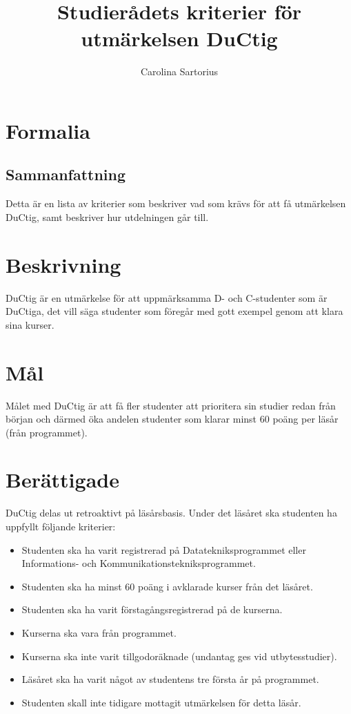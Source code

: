\documentclass{dsekprotokoll}
\title{Studierådets kriterier för utmärkelsen DuCtig}
\author{Carolina Sartorius}
\begin{document}
\maketitle

\section{Formalia}
\subsection{Sammanfattning}
Detta är en lista av kriterier som beskriver vad som krävs för att få utmärkelsen DuCtig, samt beskriver hur utdelningen går till.
\section{Beskrivning}
DuCtig är en utmärkelse för att uppmärksamma D- och C-studenter som är DuCtiga, det vill
säga studenter som föregår med gott exempel genom att klara sina kurser.

\section{Mål}
Målet med DuCtig är att få fler studenter att prioritera sin studier redan från början och därmed
öka andelen studenter som klarar minst 60 poäng per läsår (från programmet).

\section{Berättigade}
DuCtig delas ut retroaktivt på läsårsbasis. Under det läsåret ska studenten ha uppfyllt följande
kriterier:

\begin{itemize}
	\item Studenten ska ha varit registrerad på Datatekniksprogrammet eller Informations- och
	      Kommunikationstekniksprogrammet.
	\item Studenten ska ha minst 60 poäng i avklarade kurser från det läsåret.
	\item Studenten ska ha varit förstagångsregistrerad på de kurserna.
	\item Kurserna ska vara från programmet.
	\item Kurserna ska inte varit tillgodoräknade (undantag ges vid utbytesstudier).
	\item Läsåret ska ha varit något av studentens tre första år på programmet.
	\item Studenten skall inte tidigare mottagit utmärkelsen för detta läsår.
\end{itemize}
\end{document}
